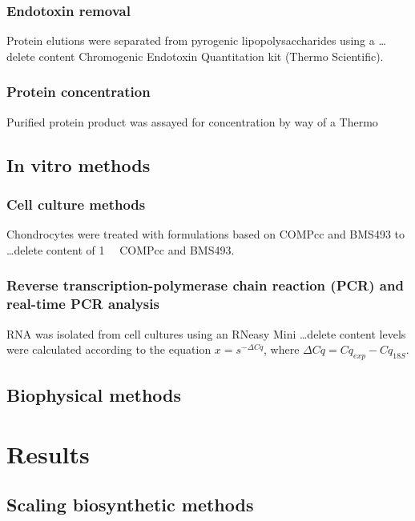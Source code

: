 \begin{refsection}
\subsubsection{Endotoxin removal}

Protein elutions were separated from pyrogenic lipopolysaccharides using a
\ldots delete content Chromogenic Endotoxin Quantitation kit (Thermo Scientific).

\subsubsection{Protein concentration}
Purified protein product was assayed for concentration by way of a Thermo

\subsection{In vitro methods}

\subsubsection{Cell culture methods}
\label{sec:culture_methods}

Chondrocytes were treated with formulations based on COMPcc and BMS493 to
\ldots delete content of \SI{1}{\micro\moLar} COMPcc and BMS493.

\subsubsection{Reverse transcription-polymerase chain reaction (PCR) and
real-time PCR analysis} 

RNA was isolated from cell cultures using an RNeasy Mini
\ldots delete content levels were calculated according to the equation ${x=s^{- \Delta C q}}$, where
${\Delta C q = C q_{exp} - C q _{18S}}$.

\subsection{Biophysical methods}

\section{Results}

\subsection{Scaling biosynthetic methods}


\end{refsection}
